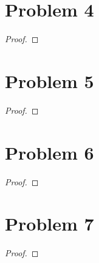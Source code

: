 \documentclass{article}
\begin{document}
\section*{Problem 4}
    \begin{proof}
        
    \end{proof}

\section*{Problem 5}
    \begin{proof}
        
    \end{proof}

\section*{Problem 6}
    \begin{proof}
        
    \end{proof}

\section*{Problem 7}
    \begin{proof}
        
    \end{proof}
\end{document}
